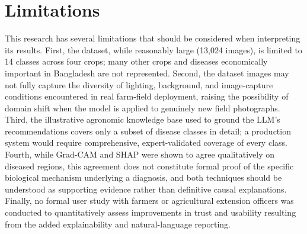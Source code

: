 \documentclass[12pt,a4paper,oneside]{report}
\begin{document}
\section{Limitations}
This research has several limitations that should be considered when interpreting its results. First, the
dataset, while reasonably large (13,024 images), is limited to 14 classes across four crops; many other crops and
diseases economically important in Bangladesh are not represented. Second, the dataset images may not fully
capture the diversity of lighting, background, and image-capture conditions encountered in real farm-field
deployment, raising the possibility of domain shift when the model is applied to genuinely new field photographs.
Third, the illustrative agronomic knowledge base used to ground the LLM's recommendations covers only a subset of
disease classes in detail; a production system would require comprehensive, expert-validated coverage of every
class. Fourth, while Grad-CAM and SHAP were shown to agree qualitatively on diseased regions, this agreement does
not constitute formal proof of the specific biological mechanism underlying a diagnosis, and both techniques
should be understood as supporting evidence rather than definitive causal explanations. Finally, no formal user
study with farmers or agricultural extension officers was conducted to quantitatively assess improvements in
trust and usability resulting from the added explainability and natural-language reporting.
\end{document}
